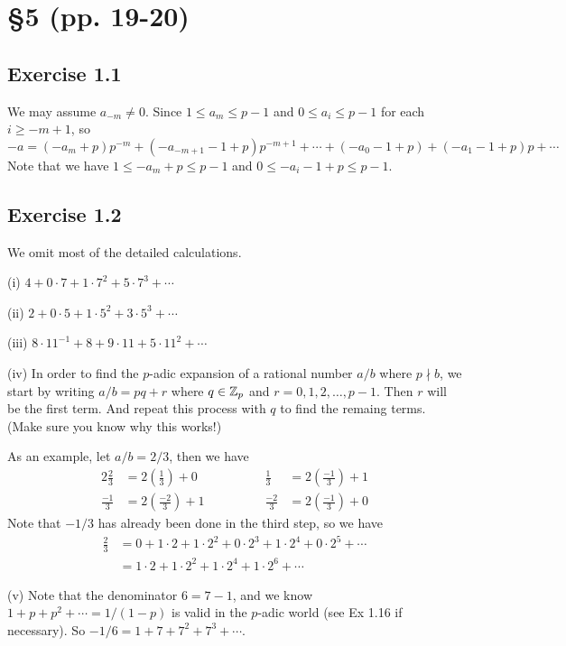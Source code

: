 \documentclass[../Koblitz.tex]{subfiles}
\begin{document}
\section*{\S5 (pp. 19-20)}

\subsection*{Exercise 1.1}
We may assume $a_{-m}\neq0$. Since $1\leq a_m \leq p-1$ and $0\leq a_i \leq p-1$ for each $i\geq-m+1$, so
$$-a = (-a_m+p)p^{-m}+(-a_{-m+1}-1+p)p^{-m+1}+\cdots+(-a_0-1+p)+(-a_1-1+p)p+\cdots$$
Note that we have $1\leq -a_m+p\leq p-1$ and $0\leq -a_i-1+p\leq p-1$.

\subsection*{Exercise 1.2}

We omit most of the detailed calculations.

(i) $4+0\cdot7+1\cdot7^2+5\cdot7^3+\cdots$

(ii) $2+0\cdot5+1\cdot5^2+3\cdot5^3+\cdots$

(iii) $8\cdot11^{-1}+8+9\cdot11+5\cdot11^2+\cdots$

(iv) In order to find the $p$-adic expansion of a rational number $a/b$ where $p\nmid b$, we start by writing $a/b=pq+r$ where $q\in\mathbb{Z}_p$ and $r=0,1,2,\ldots,p-1$. Then $r$ will be the first term. And repeat this process with $q$ to find the remaing terms. (Make sure you know why this works!)

As an example, let $a/b=2/3$, then we have
\begin{alignat*}{2}
\frac{2}{3}&=2\left(\frac{1}{3}\right)+0 &\qquad\qquad \frac{1}{3}&=2\left(\frac{-1}{3}\right)+1 \\
\frac{-1}{3}&=2\left(\frac{-2}{3}\right)+1 &\qquad\qquad
\frac{-2}{3}&=2\left(\frac{-1}{3}\right)+0
\end{alignat*}
Note that $-1/3$ has already been done in the third step, so we have \begin{align*}
\frac{2}{3} &= 0+1\cdot2+1\cdot2^2+0\cdot2^3+1\cdot2^4+0\cdot2^5+\cdots \\
&= 1\cdot2+1\cdot2^2+1\cdot2^4+1\cdot2^6+\cdots
\end{align*}

(v) Note that the denominator $6=7-1$, and we know $1+p+p^2+\cdots=1/(1-p)$ is valid in the $p$-adic world (see Ex 1.16 if necessary). So $-1/6=1+7+7^2+7^3+\cdots$.
\end{document}
